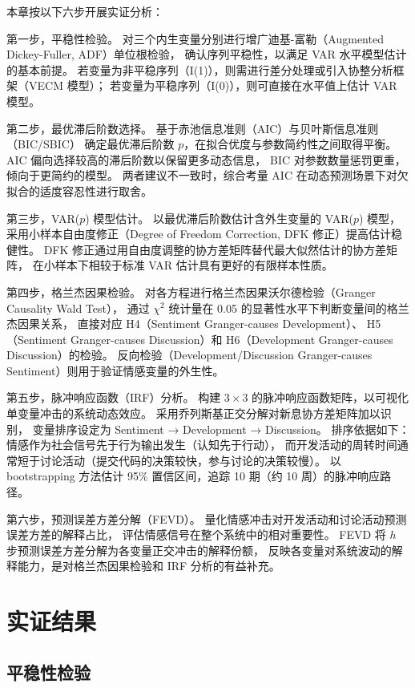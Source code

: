 本章按以下六步开展实证分析：

第一步，平稳性检验。
对三个内生变量分别进行增广迪基-富勒（Augmented Dickey-Fuller, ADF）单位根检验，
确认序列平稳性，以满足 VAR 水平模型估计的基本前提。
若变量为非平稳序列（I(1)），则需进行差分处理或引入协整分析框架（VECM 模型）；
若变量为平稳序列（I(0)），则可直接在水平值上估计 VAR 模型。

第二步，最优滞后阶数选择。
基于赤池信息准则（AIC）与贝叶斯信息准则（BIC/SBIC）
确定最优滞后阶数 $p$，在拟合优度与参数简约性之间取得平衡。
AIC 偏向选择较高的滞后阶数以保留更多动态信息，
BIC 对参数数量惩罚更重，倾向于更简约的模型。
两者建议不一致时，综合考量 AIC 在动态预测场景下对欠拟合的适度容忍性进行取舍。

第三步，VAR($p$) 模型估计。
以最优滞后阶数估计含外生变量的 VAR($p$) 模型，
采用小样本自由度修正（Degree of Freedom Correction, DFK 修正）提高估计稳健性。
DFK 修正通过用自由度调整的协方差矩阵替代最大似然估计的协方差矩阵，
在小样本下相较于标准 VAR 估计具有更好的有限样本性质。

第四步，格兰杰因果检验。
对各方程进行格兰杰因果沃尔德检验（Granger Causality Wald Test），
通过 $\chi^2$ 统计量在 0.05 的显著性水平下判断变量间的格兰杰因果关系，
直接对应 H4（Sentiment Granger-causes Development）、
H5（Sentiment Granger-causes Discussion）和 H6（Development Granger-causes Discussion）的检验。
反向检验（Development/Discussion Granger-causes Sentiment）则用于验证情感变量的外生性。

第五步，脉冲响应函数（IRF）分析。
构建 $3 \times 3$ 的脉冲响应函数矩阵，以可视化单变量冲击的系统动态效应。
采用乔列斯基正交分解对新息协方差矩阵加以识别，
变量排序设定为 Sentiment → Development → Discussion。
排序依据如下：情感作为社会信号先于行为输出发生（认知先于行动），
而开发活动的周转时间通常短于讨论活动（提交代码的决策较快，参与讨论的决策较慢）。
以 bootstrapping 方法估计 95\% 置信区间，追踪 10 期（约 10 周）的脉冲响应路径。

第六步，预测误差方差分解（FEVD）。
量化情感冲击对开发活动和讨论活动预测误差方差的解释占比，
评估情感信号在整个系统中的相对重要性。
FEVD 将 $h$ 步预测误差方差分解为各变量正交冲击的解释份额，
反映各变量对系统波动的解释能力，是对格兰杰因果检验和 IRF 分析的有益补充。


\section{实证结果}

\subsection{平稳性检验}

